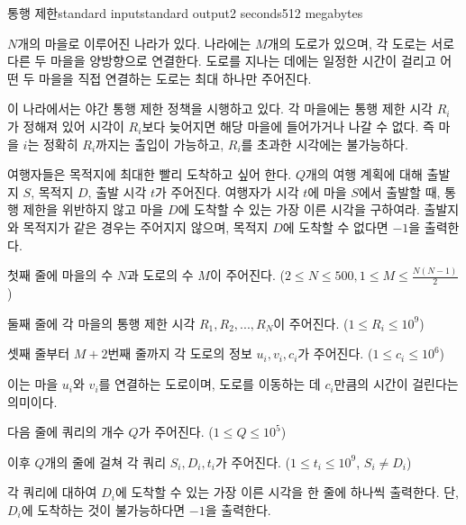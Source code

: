 \begin{problem}{통행 제한}{standard input}{standard output}{2 seconds}{512 megabytes}

$N$개의 마을로 이루어진 나라가 있다. 나라에는 $M$개의 도로가 있으며, 각 도로는 서로 다른 두 마을을 양방향으로 연결한다. 도로를 지나는 데에는 일정한 시간이 걸리고 어떤 두 마을을 직접 연결하는 도로는 최대 하나만 주어진다.

이 나라에서는 야간 통행 제한 정책을 시행하고 있다. 각 마을에는 통행 제한 시각 $R_i$가 정해져 있어 시각이 $R_i$보다 늦어지면 해당 마을에 들어가거나 나갈 수 없다. 즉 마을 $i$는 정확히 $R_i$까지는 출입이 가능하고, $R_i$를 초과한 시각에는 불가능하다.

여행자들은 목적지에 최대한 빨리 도착하고 싶어 한다. $Q$개의 여행 계획에 대해 출발지 $S$, 목적지 $D$, 출발 시각 $t$가 주어진다. 여행자가 시각 $t$에 마을 $S$에서 출발할 때, 통행 제한을 위반하지 않고 마을 $D$에 도착할 수 있는 가장 이른 시각을 구하여라. 출발지와 목적지가 같은 경우는 주어지지 않으며, 목적지 $D$에 도착할 수 없다면 $-1$을 출력한다.

\InputFile
첫째 줄에 마을의 수 $N$과 도로의 수 $M$이 주어진다. ($2 \le N \le 500, 1 \le M \le \frac{N(N-1)}{2}$)

둘째 줄에 각 마을의 통행 제한 시각 $R_1, R_2, ..., R_N$이 주어진다. ($1 \le R_i \le 10^9$)

셋째 줄부터 $M+2$번째 줄까지 각 도로의 정보 $u_i, v_i, c_i$가 주어진다. ($1 \le c_i \le 10^6$)

이는 마을 $u_i$와 $v_i$를 연결하는 도로이며, 도로를 이동하는 데 $c_i$만큼의 시간이 걸린다는 의미이다.

다음 줄에 쿼리의 개수 $Q$가 주어진다. ($1 \le Q \le 10^5$)

이후 $Q$개의 줄에 걸쳐 각 쿼리 $S_i, D_i, t_i$가 주어진다. ($1 \le t_i \le 10^9$, $S_i \ne D_i$)

\OutputFile
각 쿼리에 대하여 $D_i$에 도착할 수 있는 가장 이른 시각을 한 줄에 하나씩 출력한다. 단, $D_i$에 도착하는 것이 불가능하다면 $-1$을 출력한다.

\Example

\begin{example}
%
\end{example}

\end{problem}

